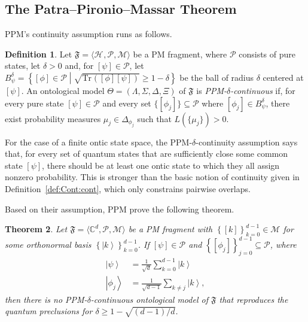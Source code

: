 \documentclass[DIV=calc,paper=a4,fontsize=11pt,twocolumn]{scrartcl} %
\theoremstyle{definition}
\newtheorem{definition}{Definition}[section]
\theoremstyle{plain}
\newtheorem{theorem}[definition]{Theorem}
\newcommand{\Ket}[1]{\ensuremath{\left \vert #1 \right \rangle}}
\newcommand{\Proj}[1]{\ensuremath{\left [ #1 \right ]}}
\newcommand{\Hilb}[1][]{\ensuremath{\mathcal{H}_{#1}}}
\newcommand{\Tr}[2][]{\ensuremath{\text{Tr}_{#1} \left ( #2 \right )}}
\begin{document}
\subsection{The Patra--Pironio--Massar Theorem}

\label{PPM}

PPM's continuity assumption runs as follows.

\begin{definition}
Let $\mathfrak{F} = \langle \Hilb, \mathcal{P}, \mathcal{M} \rangle$
be a PM fragment, where $\mathcal{P}$ consists of pure states, let
$\delta > 0$ and, for $\Proj{\psi} \in \mathcal{P}$, let
$B^{\delta}_{\psi} = \left \{ \Proj{\phi} \in \mathcal{P} \middle |
\sqrt{\Tr{\Proj{\phi}\Proj{\psi}}} \geq 1 - \delta \right \}$ be
the ball of radius $\delta$ centered at $\Proj{\psi}$.  An
ontological model $\Theta = (\Lambda, \Sigma, \Delta, \Xi)$ of
$\mathfrak{F}$ is \emph{PPM-$\delta$-continuous} if, for every pure
state $\Proj{\psi} \in \mathcal{P}$ and every set $\{\Proj{\phi_j}\}
\subseteq \mathcal{P}$ where $\Proj{\phi_j} \in B^{\delta}_{\psi}$,
there exist probability measures $\mu_j \in \Delta_{\phi_j}$ such
that $L(\{\mu_j\}) > 0$.
\end{definition}

For the case of a finite ontic state space, the
PPM-$\delta$-continuity assumption says that, for every set of quantum
states that are sufficiently close some common state $\Proj{\psi}$,
there should be at least one ontic state to which they all assign
nonzero probability.  This is stronger than the basic notion of
continuity given in Definition~\ref{def:Cont:cont}, which only
constrains pairwise overlaps.

Based on their assumption, PPM prove the following theorem.
\begin{theorem}
\label{thm:PPM:PPM}
Let $\mathfrak{F} = \langle \mathbb{C}^d, \mathcal{P}, \mathcal{M}
\rangle$ be a PM fragment with $\left \{ \Proj{k} \right
\}_{k=0}^{d-1} \in \mathcal{M}$ for some orthonormal basis $\left \{
\Ket{k} \right \}_{k=0}^{d-1}$.  If $\Proj{\psi} \in \mathcal{P}$
and $\left \{ \Proj{\phi_j} \right \}_{j=0}^{d-1} \subseteq
\mathcal{P}$, where
\begin{align}
\Ket{\psi} & = \frac{1}{\sqrt{d}}\sum_{k=0}^{d-1} \Ket{k} \\
\Ket{\phi_j} & = \frac{1}{\sqrt{d-1}} \sum_{k \neq j} \Ket{k},
\end{align}
then there is no PPM-$\delta$-continuous ontological model of
$\mathfrak{F}$ that reproduces the quantum preclusions for $\delta
\geq 1 - \sqrt{(d-1)/d}$.
\end{theorem}
\end{document}
